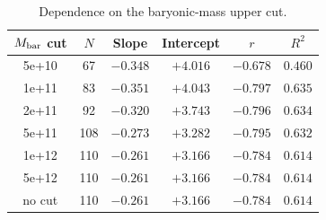 \begin{table}[htbp]
\centering
\caption{Dependence on the baryonic-mass upper cut.}
\label{tab:selection}
\begin{tabular}{cccccc}
\hline
$M_{\rm bar}$ cut & $N$ & Slope & Intercept & $r$ & $R^2$ \\
\hline
5e+10 & 67 & $-0.348$ & $+4.016$ & $-0.678$ & $0.460$ \\
1e+11 & 83 & $-0.351$ & $+4.043$ & $-0.797$ & $0.635$ \\
2e+11 & 92 & $-0.320$ & $+3.743$ & $-0.796$ & $0.634$ \\
5e+11 & 108 & $-0.273$ & $+3.282$ & $-0.795$ & $0.632$ \\
1e+12 & 110 & $-0.261$ & $+3.166$ & $-0.784$ & $0.614$ \\
5e+12 & 110 & $-0.261$ & $+3.166$ & $-0.784$ & $0.614$ \\
no cut & 110 & $-0.261$ & $+3.166$ & $-0.784$ & $0.614$ \\
\hline
\end{tabular}
\end{table}
